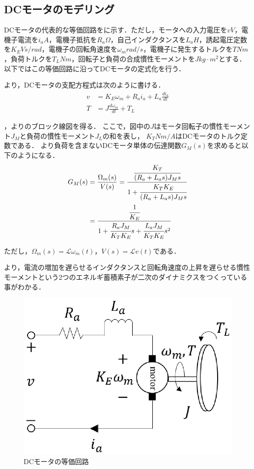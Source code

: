 \subsection{DCモータのモデリング}
DCモータの代表的な等価回路をに示す．\cite{dcmmodeling}ただし，モータへの入力電圧を$v\unit{V}$，電機子電流を$i_{a}\unit{A}$，電機子抵抗を$R_{a}\unit{\Omega}$，自己インダクタンスを$L_{a}\unit{H}$，誘起電圧定数を$K_{E}\unit{Vs/rad}$，電機子の回転角速度を$\omega_{m}\unit{rad/s}$，電機子に発生するトルクを$T\unit{Nm}$，負荷トルクを$T_L\unit{Nm}$，回転子と負荷の合成慣性モーメントを$J\unit{kg\cdot m^2}$とする．以下ではこの等価回路に沿ってDCモータの定式化を行う．

より，DCモータの支配方程式は次のように書ける．
\begin{align}
v &= K_{E}\omega_{m} + R_{a}i_{a} + L_{a}\frac{di_{a}}{dt} \label{eq::dcm_v} \\
T &= J\frac{d\omega_{m}}{dt} + T_{L} \label{eq::dcm_t}
\end{align}

，よりのブロック線図を得る．
ここで，図中の$J$はモータ回転子の慣性モーメント$J_{M}$と負荷の慣性モーメント$J_{L}$の和を表し，
$K_{T}\unit{Nm/A}$はDCモータのトルク定数である．
より負荷を含まないDCモータ単体の伝達関数$G_{M}(s)$を求めると以下のようになる．
\begin{align}
G_{M}(s) &= \frac{\Omega_{m}(s)}{V(s)} = 
\frac{\cfrac{K_{T}}{(R_{a} + L_{a}s)J_{M}s}}{1 + \cfrac{K_{T}K_{E}}{(R_{a} + L_{a}s)J_{M}s}} \nonumber \\
 &= \frac{\cfrac{1}{K_{E}}}{1 + \cfrac{R_{a}J_{M}}{K_{T}K_{E}}s + \cfrac{L_{a}J_{M}}{K_{T}K_{E}}s^2} \label{eq::dcm_tf}
\end{align}

ただし，$\Omega_{m}(s) = \mathcal{L}{\omega_{m}(t)}，V(s) = \mathcal{L}{v(t)}$である．

より，電流の増加を遅らせるインダクタンスと回転角速度の上昇を遅らせる慣性モーメントという2つのエネルギ蓄積素子が二次のダイナミクスをつくっている事がわかる．

\begin{figure}[htb]
  \centering
    \includegraphics[width=0.5\hsize]{picture/eps/dcm_circit.eps}
    \caption{DCモータの等価回路}
    \label{fig::dcm_circit}
\end{figure}

